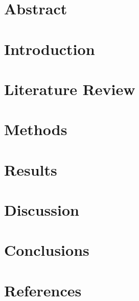 \documentclass[12pt]{article}
\begin{document}

\restoregeometry

\setcounter{tocdepth}{5}
\tableofcontents
\pagebreak

\listoffigures
\listoftables
\pagebreak

\justify

\section*{Abstract}

\pagebreak

\section{Introduction}

\pagebreak

\section{Literature Review}

\pagebreak

\section{Methods}

\pagebreak

\section{Results}

\pagebreak

\section{Discussion}

\pagebreak

\section{Conclusions}

\pagebreak

\section{References}
\label{sec:ref}
\printbibliography[heading=none]
\end{document}
